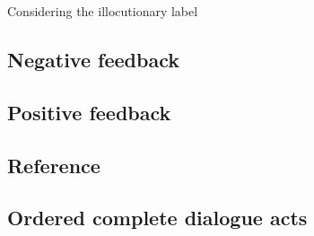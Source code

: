 			Considering the illocutionary label

    \subsection{Negative feedback}

    \subsection{Positive feedback}

    \subsection{Reference}

    \subsection{Ordered complete dialogue acts}
